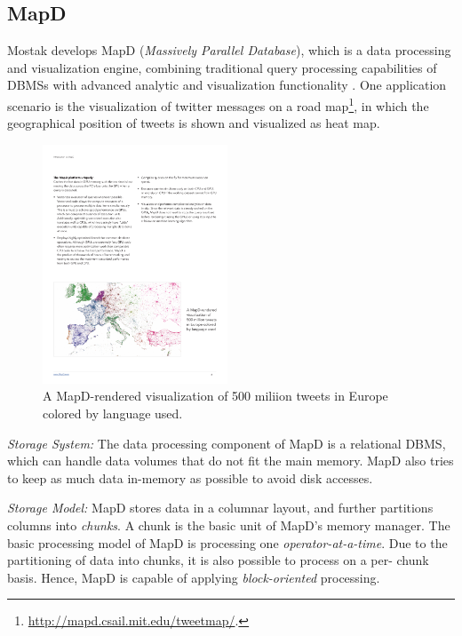 \documentclass[twocolumn]{article}
\begin{document}
\subsection{MapD}
Mostak develops MapD (\textit{Massively Parallel Database}), which is a data processing and visualization engine, combining traditional query processing capabilities of DBMSs with advanced analytic and visualization functionality \cite{mapd:2015}. 
One application scenario is the visualization of twitter messages on a road map\footnote{\href{http://mapd.csail.mit.edu/tweetmap/}{http://mapd.csail.mit.edu/tweetmap/}.}, in which the geographical position of tweets is shown and visualized as heat map.
\begin{figure}[htb]
        \centering
        \includegraphics[width=0.49\textwidth]{mapd-visualization.pdf}
        \caption{A MapD-rendered visualization of 500 miliion tweets in Europe colored by language used.}
        \label{fig:mapd-visualization}
\end{figure}

\noindent
\textit{Storage System:} The data processing component of MapD is a relational DBMS, which can handle data volumes that do not fit the main memory. MapD also tries to keep as much data in-memory as possible to avoid disk accesses.

\noindent
\textit{Storage Model:} 
MapD stores data in a columnar layout, and further partitions columns into \textit{chunks}. 
A chunk is the basic unit of MapD's memory manager. 
The basic processing model of MapD is processing one \textit{operator-at-a-time}. 
Due to the partitioning of data into chunks, it is also possible to process on a per- chunk basis. Hence, MapD is capable of applying \textit{block-oriented} processing.
\end{document}
